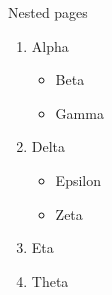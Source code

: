 \documentclass{beamer}
\begin{document}
\begin{frame}[allowframebreaks=.8]{Nested pages}
\begin{enumerate}
\item \rule{0pt}{35pt}Alpha
\begin{itemize}
\item \rule{0pt}{35pt}Beta
\item \rule{0pt}{35pt}Gamma
\end{itemize}
\item \rule{0pt}{35pt}Delta
\begin{itemize}
\item \rule{0pt}{35pt}Epsilon
\item \rule{0pt}{35pt}Zeta
\end{itemize}
\item \rule{0pt}{35pt}Eta
\item \rule{0pt}{35pt}Theta
\end{enumerate}
\end{frame}
\end{document}
